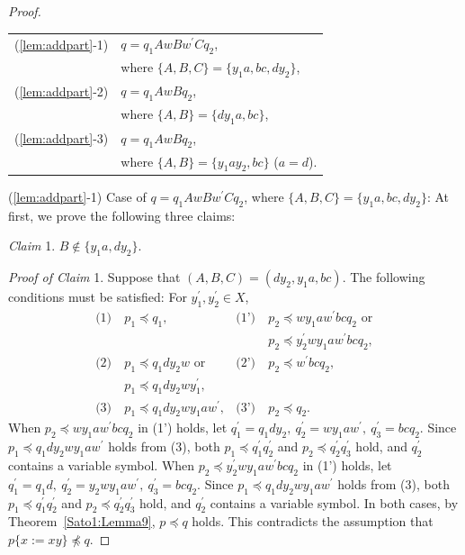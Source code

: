 \begin{proof}
\smallskip

  \begin{tabular}{ll}
  (\ref{lem:addpart}-1) & $q=q_{1}AwBw^{\prime}Cq_{2}$,\\
  & where $\{ A,B,C \} = \{ y_{1}a,bc,dy_{2} \}$,\\
  (\ref{lem:addpart}-2) & $q=q_{1}AwBq_{2}$,\\
  & where $\{ A,B \} = \{ dy_{1}a,bc \}$,\\
  (\ref{lem:addpart}-3) & $q=q_{1}AwBq_{2}$,\\
  & where $\{ A,B \} = \{ y_{1}ay_{2},bc \}$ ($a = d$).
  \end{tabular}
  
  \smallskip

  \noindent
  (\ref{lem:addpart}-1) Case of $q=q_{1}AwBw^{\prime}Cq_{2}$, where $\{ A,B,C \} = \{ y_{1}a,bc,dy_{2} \}$:
  At first, we prove the following three claims:

  \smallskip

  \noindent
  \textit{Claim} 1. $B \not\in \{y_{1}a, dy_{2}\}$.

  \smallskip
  \noindent
  \textit{Proof of Claim} 1.
  Suppose that $(A, B, C) = (dy_{2}, y_{1}a, bc)$. The following conditions must be satisfied: For $y_{1}^{\prime},y_{2}^{\prime}\in X$, 
  \begin{align*}
    \textrm{(1)}~& p_{1} \preceq q_{1}, & \textrm{(1')}~& p_{2} \preceq wy_{1}aw^{\prime}bcq_{2}\mbox{ or} \\
    & & & p_{2} \preceq y_{2}^{\prime}wy_{1}aw^{\prime}bcq_{2},\\
    \textrm{(2)}~& p_{1} \preceq q_{1}dy_{2}w\mbox{ or}  & \textrm{(2')}~& p_{2} \preceq w^{\prime}bcq_{2},\\
    & p_{1} \preceq q_{1}dy_{2}wy_{1}^{\prime}, & & \\
    \textrm{(3)}~& p_{1} \preceq q_{1}dy_{2}wy_{1}aw^{\prime}, & \textrm{(3')}~& p_{2} \preceq q_{2}.
  \end{align*}
  When $p_{2} \preceq wy_{1}aw^{\prime}bcq_{2}$ in (1') holds, let $q^{\prime}_{1}=q_{1}dy_{2},~q^{\prime}_{2}=wy_{1}aw^{\prime},~q^{\prime}_{3}=bcq_{2}$.
  Since $p_{1} \preceq q_{1}dy_{2}wy_{1}aw^{\prime}$ holds from (3), both $p_{1} \preceq q^{\prime}_{1}q^{\prime}_{2}$ and $p_{2} \preceq q^{\prime}_{2}q^{\prime}_{3}$ hold, and $q_{2}^{\prime}$ contains a variable symbol.
  When $p_{2} \preceq y_{2}^{\prime}wy_{1}aw^{\prime}bcq_{2}$ in (1') holds, let $q^{\prime}_{1}=q_{1}d,~q^{\prime}_{2}=y_{2}wy_{1}aw^{\prime},~q^{\prime}_{3}=bcq_{2}$.
  Since $p_{1} \preceq q_{1}dy_{2}wy_{1}aw^{\prime}$ holds from (3), both $p_{1} \preceq q^{\prime}_{1}q^{\prime}_{2}$ and $p_{2} \preceq q^{\prime}_{2}q^{\prime}_{3}$ hold, and $q_{2}^{\prime}$ contains a variable symbol.
  In both cases, by Theorem~\ref{Sato1:Lemma9}, $p \preceq q$ holds.
  This contradicts the assumption that $p \{ x := xy \} \not \preceq q$.


\end{proof}

